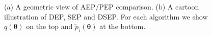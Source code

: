 
%
\begin{figure}
\centering
\def\svgwidth{0.3\linewidth}
\subfigure[\label{fig:aep_vs_pep}]{
}
%
\hspace{0.5in}
%
\def\svgwidth{0.35\linewidth}
\subfigure[\label{fig:dep_sep_dsep}]{
}

\caption{(a) A geometric view of AEP/PEP comparison. (b) A cartoon illustration of DEP, SEP and DSEP. For each algorithm we show $q(\bm{\theta})$ on the top and $\tilde{p}_i(\bm{\theta})$ at the bottom.}

\end{figure}